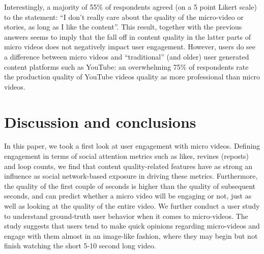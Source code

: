 Interestingly, a majority of 55\% of respondents agreed (on a 5 point Likert scale) to the statement: ``I don't really care about the quality of the micro-video or stories, as long as I like the content''. This result, together with the previous answers seems to imply that   the fall off in content quality in the latter parts of micro videos does not negatively impact user engagement. However, users do see a difference between micro videos and ``traditional'' (and older) user generated content platforms such as YouTube: an overwhelming 75\% of respondents rate the production quality of YouTube videos quality as more professional than micro videos.

\section{Discussion and conclusions}
In this paper, we took a first look at user engagement with micro videos. Defining engagement in terms of social attention metrics such as likes, revines (reposts) and loop counts, we find that content quality-related features have as strong an influence as social network-based exposure in driving these metrics. Furthermore, the quality of the first couple of seconds is higher than the quality of subsequent seconds, and can predict whether a micro video will be engaging or not, just as well as looking at the quality of the entire video. We further conduct a user study to understand ground-truth user behavior when it comes to micro-videos. The study suggests that users tend to make quick opinions regarding micro-videos and engage with them almost in an image-like fashion, where they may begin but not finish  watching the short 5-10 second long video. 

